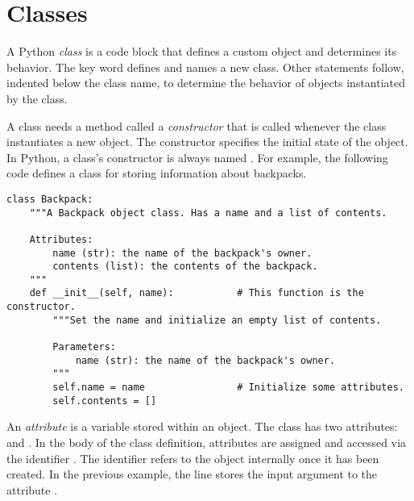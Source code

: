 \label{lab:OOP}

\section*{Classes} %

A Python \emph{class} is a code block that defines a custom object and determines its behavior.
The  key word defines and names a new class.
Other statements follow, indented below the class name, to determine the behavior of objects instantiated by the class.

A class needs a method called a \emph{constructor} that is called whenever the class instantiates a new object.
The constructor specifies the initial state of the object.
In Python, a class's constructor is always named .
For example, the following code defines a class for storing information about backpacks.

\begin{lstlisting}
class Backpack:
    """A Backpack object class. Has a name and a list of contents.

    Attributes:
        name (str): the name of the backpack's owner.
        contents (list): the contents of the backpack.
    """
    def __init__(self, name):           # This function is the constructor.
        """Set the name and initialize an empty list of contents.

        Parameters:
            name (str): the name of the backpack's owner.
        """
        self.name = name                # Initialize some attributes.
        self.contents = []
\end{lstlisting}

An \emph{attribute} is a variable stored within an object.
The  class has two attributes:  and .
In the body of the class definition, attributes are assigned and accessed via the identifier .
The identifier  refers to the object internally once it has been created.
In the previous example, the line  stores the input argument  to the attribute .


